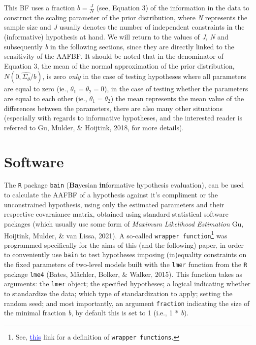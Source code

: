 \documentclass[
  english,
  man]{apa6}
\begin{document}
This BF uses a fraction \(b = \frac{J}{N}\) (see, Equation 3) of the information in the data to construct the scaling parameter of the prior distribution, where \emph{N} represents the sample size and \emph{J} usually denotes the number of independent constraints in the (informative) hypothesis at hand. We will return to the values of \emph{J}, \emph{N} and subsequently \emph{b} in the following sections, since they are directly linked to the sensitivity of the AAFBF. It should be noted that in the denominator of Equation 3, the mean of the normal approximation of the prior distribution, \(N(0,\hat{\Sigma_{\theta}}/b)\), is zero \emph{only} in the case of testing hypotheses where all parameters are equal to zero (ie., \(\theta_1 = \theta_2 = 0\)), in the case of testing whether the parameters are equal to each other (ie., \(\theta_1 = \theta_2\)) the mean represents the mean value of the differences between the parameters, there are also many other situations (especially with regards to informative hypotheses, and the interested reader is referred to Gu, Mulder, \& Hoijtink, 2018, for more details).

\newpage

\hypertarget{software}{%
\section{Software}\label{software}}

The \texttt{R} package \texttt{bain} (\textbf{Ba}yesian \textbf{in}formative hypothesis evaluation), can be used to calculate the AAFBF of a hypothesis against it's compliment or the unconstrained hypothesis, using only the estimated parameters and their respective covaraiance matrix, obtained using standard statistical software packages (which usually use some form of \emph{Maximum Likelihood Estimation} Gu, Hoijtink, Mulder, \& van Lissa, 2021). A so-called \texttt{wrapper\ function}\footnote{See, \href{https://en.wikipedia.org/wiki/Wrapper_function}{\textcolor{blue}{this}} link for a definition of \texttt{wrapper\ functions}.} was programmed specifically for the aims of this (and the following) paper, in order to conveniently use \texttt{bain} to test hypotheses imposing (in)equality constraints on the fixed parameters of two-level models built with the \texttt{lmer} function from the \texttt{R} package \texttt{lme4} (Bates, Mächler, Bolker, \& Walker, 2015). This function takes as arguments: the \texttt{lmer} object; the specified hypotheses; a logical indicating whether to standardize the data; which type of standardization to apply; setting the random seed; and most importantly, an argument \texttt{fraction} indicating the size of the minimal fraction \emph{b}, by default this is set to 1 (i.e., 1 * \emph{b}).
\end{document}
